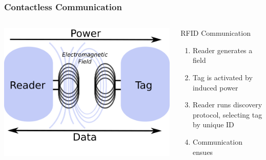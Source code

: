 \documentclass[unknownkeysallowed]{beamer}
\begin{document}
\begin{frame}
\frametitle{Contactless Communication}
  \begin{center}\begin{minipage}{.9\textwidth}
  \vspace{4mm}
  \begin{columns}[T]
    \begin{column}{.5\textwidth}
      \begin{block}{}
        \begin{center}
          \includegraphics[width=0.4\paperwidth]{figures/emitterAndTag.png}
        \end{center}
      \end{block}
    \end{column}
    \begin{column}{.5\textwidth}
      \vspace{4mm}
     \begin{block}{RFID Communication}
		\begin{enumerate}
        \pause
		    \item{Reader generates a field}
        \pause
		    \item{Tag is activated by induced power}
        \pause
      	\item{Reader runs discovery protocol, selecting tag by unique ID}
        \pause
      	\item{Communication ensues}
   		\end{enumerate}
    \end{block}
    \end{column}
  \end{columns}
  \end{minipage}\end{center}
\end{frame}
\end{document}
